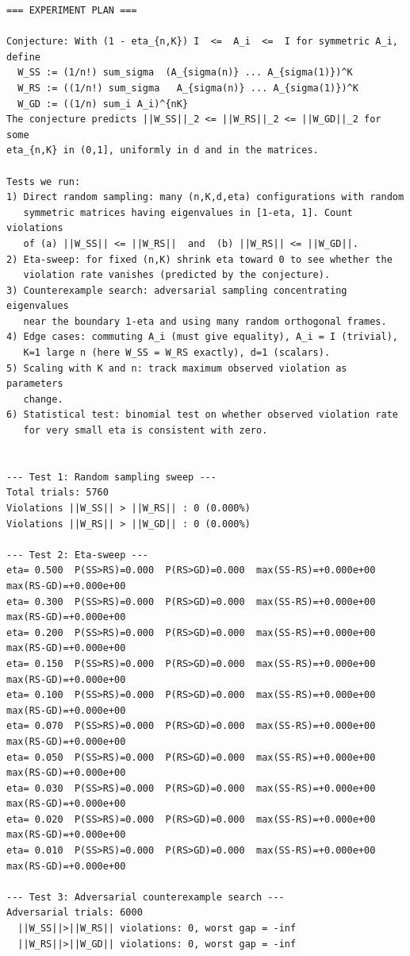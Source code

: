 \documentclass[11pt]{article}
\begin{document}
\begin{lstlisting}
=== EXPERIMENT PLAN ===

Conjecture: With (1 - eta_{n,K}) I  <=  A_i  <=  I for symmetric A_i, define
  W_SS := (1/n!) sum_sigma  (A_{sigma(n)} ... A_{sigma(1)})^K
  W_RS := ((1/n!) sum_sigma   A_{sigma(n)} ... A_{sigma(1)})^K
  W_GD := ((1/n) sum_i A_i)^{nK}
The conjecture predicts ||W_SS||_2 <= ||W_RS||_2 <= ||W_GD||_2 for some
eta_{n,K} in (0,1], uniformly in d and in the matrices.

Tests we run:
1) Direct random sampling: many (n,K,d,eta) configurations with random
   symmetric matrices having eigenvalues in [1-eta, 1]. Count violations
   of (a) ||W_SS|| <= ||W_RS||  and  (b) ||W_RS|| <= ||W_GD||.
2) Eta-sweep: for fixed (n,K) shrink eta toward 0 to see whether the
   violation rate vanishes (predicted by the conjecture).
3) Counterexample search: adversarial sampling concentrating eigenvalues
   near the boundary 1-eta and using many random orthogonal frames.
4) Edge cases: commuting A_i (must give equality), A_i = I (trivial),
   K=1 large n (here W_SS = W_RS exactly), d=1 (scalars).
5) Scaling with K and n: track maximum observed violation as parameters
   change.
6) Statistical test: binomial test on whether observed violation rate
   for very small eta is consistent with zero.


--- Test 1: Random sampling sweep ---
Total trials: 5760
Violations ||W_SS|| > ||W_RS|| : 0 (0.000%)
Violations ||W_RS|| > ||W_GD|| : 0 (0.000%)

--- Test 2: Eta-sweep ---
eta= 0.500  P(SS>RS)=0.000  P(RS>GD)=0.000  max(SS-RS)=+0.000e+00  max(RS-GD)=+0.000e+00
eta= 0.300  P(SS>RS)=0.000  P(RS>GD)=0.000  max(SS-RS)=+0.000e+00  max(RS-GD)=+0.000e+00
eta= 0.200  P(SS>RS)=0.000  P(RS>GD)=0.000  max(SS-RS)=+0.000e+00  max(RS-GD)=+0.000e+00
eta= 0.150  P(SS>RS)=0.000  P(RS>GD)=0.000  max(SS-RS)=+0.000e+00  max(RS-GD)=+0.000e+00
eta= 0.100  P(SS>RS)=0.000  P(RS>GD)=0.000  max(SS-RS)=+0.000e+00  max(RS-GD)=+0.000e+00
eta= 0.070  P(SS>RS)=0.000  P(RS>GD)=0.000  max(SS-RS)=+0.000e+00  max(RS-GD)=+0.000e+00
eta= 0.050  P(SS>RS)=0.000  P(RS>GD)=0.000  max(SS-RS)=+0.000e+00  max(RS-GD)=+0.000e+00
eta= 0.030  P(SS>RS)=0.000  P(RS>GD)=0.000  max(SS-RS)=+0.000e+00  max(RS-GD)=+0.000e+00
eta= 0.020  P(SS>RS)=0.000  P(RS>GD)=0.000  max(SS-RS)=+0.000e+00  max(RS-GD)=+0.000e+00
eta= 0.010  P(SS>RS)=0.000  P(RS>GD)=0.000  max(SS-RS)=+0.000e+00  max(RS-GD)=+0.000e+00

--- Test 3: Adversarial counterexample search ---
Adversarial trials: 6000
  ||W_SS||>||W_RS|| violations: 0, worst gap = -inf
  ||W_RS||>||W_GD|| violations: 0, worst gap = -inf


\end{lstlisting}
\end{document}
